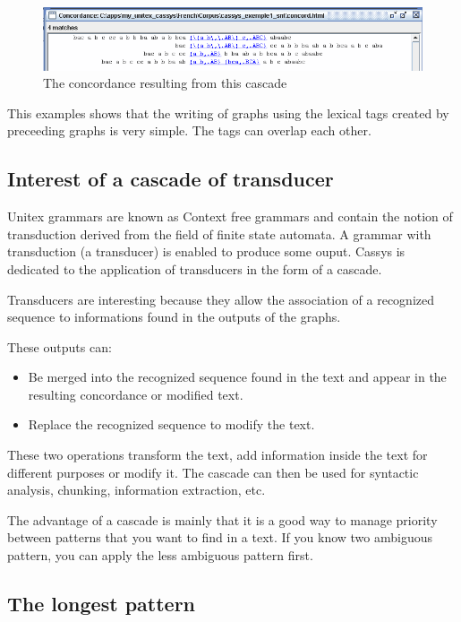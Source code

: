 \begin{figure}[!htb]
  \centering
  \includegraphics[width=15cm]{resources/img/fig13-07.png}
  \caption{The concordance resulting from this cascade}
  \label{fig13-07}
\end{figure}

\bigskip
\noindent This examples shows that the writing of graphs using the lexical tags created by preceeding graphs is very simple. The tags can overlap each other.

\subsection{Interest of a cascade of transducer}

Unitex grammars are known as Context free grammars and contain the notion of transduction derived from the field 
of finite state automata. A grammar with transduction (a transducer) is enabled to produce some ouput. 
Cassys is dedicated to the application of transducers in the form of a cascade.

\bigskip
\noindent Transducers are interesting because they allow the association of a recognized sequence to informations found in the outputs of the graphs. 

\bigskip
\noindent These outputs can:
\begin{itemize}
	\item	Be merged into the recognized sequence found in the text and appear in the resulting concordance or modified text. 
	\item	Replace the recognized sequence to modify the text. 
\end{itemize}

\bigskip
\noindent These two operations transform the text, add information inside the text for different purposes or modify it. The cascade can then be used for syntactic analysis, chunking, information extraction, etc. 

\bigskip
\noindent The advantage of a cascade is mainly that it is a good way to manage priority between patterns that you want to find in a text. If you know two ambiguous pattern, you can apply the less ambiguous pattern first.

\subsection{The longest pattern}

